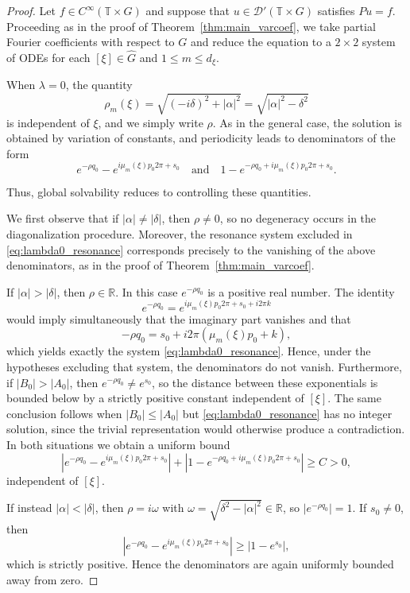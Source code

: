 \documentclass[11pt,reqno]{amsart}
\numberwithin{equation}{section}
\begin{document}
	\begin{proof}
		Let $f \in C^\infty(\mathbb{T} \times G)$ and suppose that 
		$u \in \mathcal{D}'(\mathbb{T} \times G)$ satisfies $Pu=f$. 
		Proceeding as in the proof of Theorem~\ref{thm:main_varcoef}, 
		we take partial Fourier coefficients with respect to $G$ and 
		reduce the equation to a $2\times2$ system of ODEs for each 
		$[\xi] \in \widehat G$ and $1 \le m \le d_\xi$.
		
		When $\lambda=0$, the quantity
		\[
		\rho_m(\xi)=\sqrt{(-i\delta)^2+|\alpha|^2}
		=\sqrt{|\alpha|^2-\delta^2}
		\]
		is independent of $\xi$, and we simply write $\rho$.
		As in the general case, the solution is obtained by variation of constants,
		and periodicity leads to denominators of the form
		\[
		e^{-\rho q_0}-e^{i\mu_m(\xi)p_0 2\pi+s_0}
		\quad\text{and}\quad
		1-e^{-\rho q_0+i\mu_m(\xi)p_0 2\pi+s_0}.
		\]
		
		Thus, global solvability reduces to controlling these quantities.
		
		We first observe that if $|\alpha| \ne |\delta|$, then $\rho \ne 0$,
		so no degeneracy occurs in the diagonalization procedure.
		Moreover, the resonance system excluded in
		\eqref{eq:lambda0_resonance} corresponds precisely to the
		vanishing of the above denominators, as in the proof of
		Theorem~\ref{thm:main_varcoef}.
		
		If $|\alpha|>|\delta|$, then $\rho\in\mathbb R$.
		In this case $e^{-\rho q_0}$ is a positive real number.
		The identity
		\[
		e^{-\rho q_0}=e^{i\mu_m(\xi)p_0 2\pi+s_0+i2\pi k}
		\]
		would imply simultaneously that the imaginary part vanishes
		and that
		\[
		-\rho q_0 = s_0 + i2\pi(\mu_m(\xi)p_0+k),
		\]
		which yields exactly the system \eqref{eq:lambda0_resonance}.
		Hence, under the hypotheses excluding that system,
		the denominators do not vanish.
		Furthermore, if $|B_0|>|A_0|$, then
		$e^{-\rho q_0}\neq e^{s_0}$,
		so the distance between these exponentials is bounded below by
		a strictly positive constant independent of $[\xi]$.
		The same conclusion follows when $|B_0|\le |A_0|$ but
		\eqref{eq:lambda0_resonance} has no integer solution,
		since the trivial representation would otherwise produce a contradiction.
		In both situations we obtain a uniform bound
		\[
		\left|e^{-\rho q_0}-e^{i\mu_m(\xi)p_0 2\pi+s_0}\right|
		+
		\left|1-e^{-\rho q_0+i\mu_m(\xi)p_0 2\pi+s_0}\right|
		\ge C>0,
		\]
		independent of $[\xi]$.
		
		If instead $|\alpha|<|\delta|$, then $\rho=i\omega$ with
		$\omega=\sqrt{\delta^2-|\alpha|^2}\in\mathbb R$,
		so $|e^{-\rho q_0}|=1$.
		If $s_0\neq0$, then
		\[
		|e^{-\rho q_0}-e^{i\mu_m(\xi)p_0 2\pi+s_0}|
		\ge |1-e^{s_0}|,
		\]
		which is strictly positive.
		Hence the denominators are again uniformly bounded away from zero.
		

\end{proof}
\end{document}
